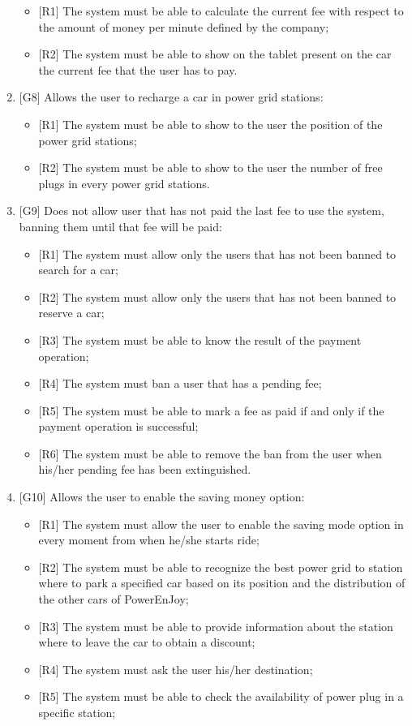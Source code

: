 \begin{enumerate}
\begin{itemize}
	\item {[R1]} The system must be able to calculate the current fee with respect to the amount of money per minute defined by the company;
	\item {[R2]} The system must be able to show on the tablet present on the car the current fee that the user has to pay.
\end{itemize}

\item {[G8]} Allows the user to recharge a car in power grid stations:

\begin{itemize}
	\item {[R1]} The system must be able to show to the user the position of the power grid stations;
	\item {[R2]} The system must be able to show to the user the number of free plugs in every power grid stations.
\end{itemize}

\item {[G9]} Does not allow user that has not paid the last fee to use the system, banning them until that fee will be paid:

\begin{itemize}
	\item {[R1]} The system must allow only the users that has not been banned to search for a car;
	\item {[R2]} The system must allow only the users that has not been banned to reserve a car;
	\item {[R3]} The system must be able to know the result of the payment operation;
	\item {[R4]} The system must ban a user that has a pending fee;
	\item {[R5]} The system must be able to mark a fee as paid if and only if the payment operation is successful;
	\item {[R6]} The system must be able to remove the ban from the user when his/her pending fee has been extinguished.
\end{itemize}

\item {[G10]} Allows the user to enable the saving money option:

\begin{itemize}
	\item {[R1]} The system must allow the user to enable the saving mode option in every moment from when he/she starts ride;
	\item {[R2]} The system must be able to recognize the best power grid to station where to park a specified car based on its position and the distribution of the other cars of PowerEnJoy;
	\item {[R3]} The system must be able to provide information about the station where to leave the car to obtain a discount;
	\item {[R4]} The system must ask the user his/her destination;
	\item {[R5]} The system must be able to check the availability of power plug in a specific station;
\end{itemize}


\end{enumerate}
